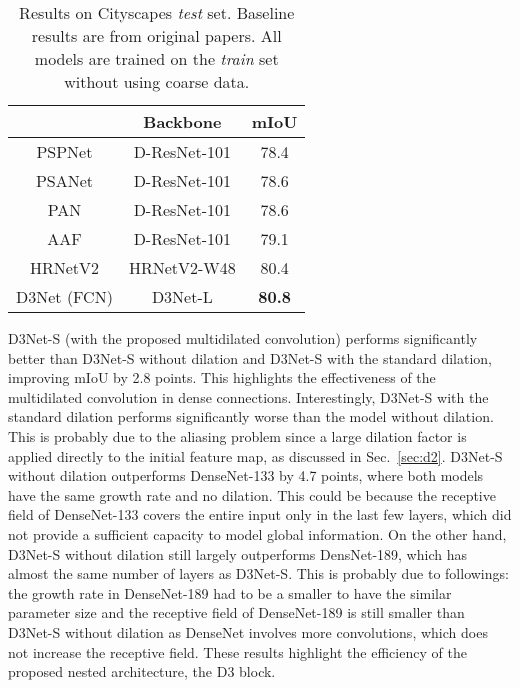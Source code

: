 \documentclass[final]{cvpr}
\begin{document}
\begin{table}[t]
\centering
\caption{\label{tab:cityscapesTest}Results on Cityscapes \textit{test} set. Baseline results are from original papers. All models are trained on the \textit{train} set without using coarse data.}
\small
\begin{tabular}{ c | c | c  } 
\hline
 & Backbone &	mIoU \\
\hline
PSPNet \cite{zhao2017pspnet}&	D-ResNet-101 &	78.4 \\
PSANet \cite{zhao2018psanet}&	D-ResNet-101 &	78.6 \\
PAN \cite{Li18PAN} &	D-ResNet-101 &	78.6 \\
AAF \cite{Ke18AAF}&	D-ResNet-101 &	79.1 \\
HRNetV2 \cite{WangSCJDZLMTWLX19} &	HRNetV2-W48 &	80.4 \\
\hline
D3Net (FCN) &	D3Net-L &	\textbf{80.8} \\
\hline
\end{tabular}
\end{table}

D3Net-S (with the proposed multidilated convolution) performs significantly better than D3Net-S without dilation and D3Net-S with the standard dilation, improving mIoU by 2.8 points. This highlights the effectiveness of the multidilated convolution in dense connections. Interestingly, D3Net-S with the standard dilation performs significantly worse than the model without dilation. This is probably due to the aliasing problem since a large dilation factor is applied directly to the initial feature map, as discussed in Sec.~\ref{sec:d2}. D3Net-S without dilation outperforms DenseNet-133 by 4.7 points, where both models have the same growth rate and no dilation. This could be because the receptive field of DenseNet-133 covers the entire input only in the last few layers, which did not provide a sufficient capacity to model global information. On the other hand, D3Net-S without dilation still largely outperforms DensNet-189, which has almost the same number of layers as D3Net-S.  This is probably due to followings: the growth rate in DenseNet-189 had to be a smaller to have the similar parameter size and the receptive field of DenseNet-189 is still smaller than D3Net-S without dilation as DenseNet involves more  convolutions, which does not increase the receptive field. These results highlight the efficiency of the proposed nested architecture, the D3 block.
\end{document}
